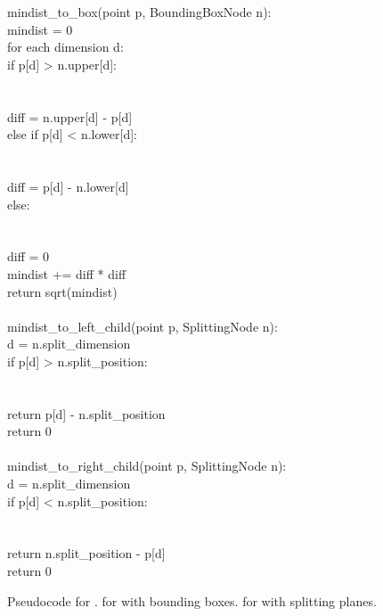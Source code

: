 \begin{figure}
\begin{pcode}
\func mindist\_to\_box(point p, BoundingBoxNode n): \\
\>   mindist = 0 \\
\>   for each dimension d: \\
\>\>      if p[d] > n.upper[d]: \\
\>\>\>  \\
\>\>\>  \\
\>\>\>         diff = n.upper[d] - p[d] \\
\>\>      else if p[d] < n.lower[d]: \\
\>\>\>  \\
\>\>\>  \\
\>\>\> diff = p[d] - n.lower[d] \\
\>\>      else: \\
\>\>\>  \\
\>\>\>  \\
\>\>\>      diff = 0 \\
\> mindist += diff * diff \\
\> return sqrt(mindist) \\
\\
\func mindist\_to\_left\_child(point p, SplittingNode n): \\
\>   d = n.split\_dimension \\
\>   if p[d] > n.split\_position: \\
\>\>    \\
\>\>    \\
\>\>      return p[d] - n.split\_position \\
\>   return 0 \\
\\
\func mindist\_to\_right\_child(point p, SplittingNode n): \\
\>   d = n.split\_dimension \\
\>   if p[d] < n.split\_position: \\
\>\>    \\
\>\>    \\
\>\>      return n.split\_position - p[d] \\
\>   return 0
\end{pcode}
\caption{Pseudocode for \mindist.   for \kdtrees with bounding boxes.
 for \kdtrees with splitting
planes.}
\label{code:mindist}
\end{figure}

